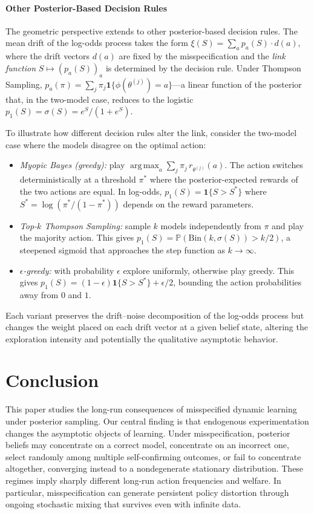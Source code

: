 \documentclass[12pt]{article}
\DeclareMathOperator*{\argmax}{arg\,max}
\renewcommand{\P}{\mathbb{P}}
\begin{document}
\paragraph{Other Posterior-Based Decision Rules}

The geometric perspective extends to other posterior-based decision rules. The mean drift of the log-odds process takes the form $\xi(S) = \sum_a p_a(S) \cdot d(a)$, where the drift vectors $d(a)$ are fixed by the misspecification and the \emph{link function} $S \mapsto (p_a(S))_a$ is determined by the decision rule. Under Thompson Sampling, $p_a(\pi) = \sum_j \pi_j \mathbf{1}\{\phi(\theta^{(j)})=a\}$---a linear function of the posterior that, in the two-model case, reduces to the logistic $p_1(S) = \sigma(S) = e^S/(1+e^S)$.

To illustrate how different decision rules alter the link, consider the two-model case where the models disagree on the optimal action:
\begin{itemize}
    \item \emph{Myopic Bayes (greedy):} play $\argmax_a \sum_j \pi_j \, r_{\theta^{(j)}}(a)$. The action switches deterministically at a threshold $\pi^*$ where the posterior-expected rewards of the two actions are equal. In log-odds, $p_1(S) = \mathbf{1}\{S > S^*\}$ where $S^* = \log(\pi^*/(1-\pi^*))$ depends on the reward parameters.
    \item \emph{Top-$k$ Thompson Sampling:} sample $k$ models independently from $\pi$ and play the majority action. This gives $p_1(S) = \P(\mathrm{Bin}(k, \sigma(S)) > k/2)$, a steepened sigmoid that approaches the step function as $k \to \infty$.
    \item \emph{$\epsilon$-greedy:} with probability $\epsilon$ explore uniformly, otherwise play greedy. This gives $p_1(S) = (1-\epsilon)\mathbf{1}\{S > S^*\} + \epsilon/2$, bounding the action probabilities away from $0$ and $1$.
\end{itemize}
Each variant preserves the drift--noise decomposition of the log-odds process but changes the weight placed on each drift vector at a given belief state, altering the exploration intensity and potentially the qualitative asymptotic behavior.


\section{Conclusion}

This paper studies the long-run consequences of misspecified dynamic learning under posterior sampling. Our central finding is that endogenous experimentation changes the asymptotic objects of learning. Under misspecification, posterior beliefs may concentrate on a correct model, concentrate on an incorrect one, select randomly among multiple self-confirming outcomes, or fail to concentrate altogether, converging instead to a nondegenerate stationary distribution. These regimes imply sharply different long-run action frequencies and welfare. In particular, misspecification can generate persistent policy distortion through ongoing stochastic mixing that survives even with infinite data.
\end{document}

